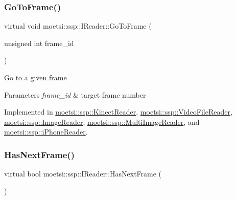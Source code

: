 \mbox{\label{classmoetsi_1_1ssp_1_1IReader_a6f1be3c06538992cca6d550bd9566681}} 
\subsubsection{\texorpdfstring{Go\+To\+Frame()}{GoToFrame()}}
{\footnotesize\ttfamily virtual void moetsi\+::ssp\+::\+I\+Reader\+::\+Go\+To\+Frame (\begin{DoxyParamCaption}\item[{unsigned int}]{frame\+\_\+id }\end{DoxyParamCaption})\hspace{0.3cm}{\ttfamily [pure virtual]}}

Go to a given frame 
\begin{DoxyParams}{Parameters}
{\em frame\+\_\+id} & target frame number \\
\hline
\end{DoxyParams}


Implemented in \hyperlink{classmoetsi_1_1ssp_1_1KinectReader_a315690c46e153a35d4ded1189e93af08}{moetsi\+::ssp\+::\+Kinect\+Reader}, \hyperlink{classmoetsi_1_1ssp_1_1VideoFileReader_ad98a532db8b1e2c3879df274b2efb082}{moetsi\+::ssp\+::\+Video\+File\+Reader}, \hyperlink{classmoetsi_1_1ssp_1_1ImageReader_a32eb88cc612e6920f4910e0803b0ce3c}{moetsi\+::ssp\+::\+Image\+Reader}, \hyperlink{classmoetsi_1_1ssp_1_1MultiImageReader_a7c552a1ad469660ea0a88b9ca85138ad}{moetsi\+::ssp\+::\+Multi\+Image\+Reader}, and \hyperlink{classmoetsi_1_1ssp_1_1iPhoneReader_a27b6dea97e4c4db8e4e749cc9e30e7ca}{moetsi\+::ssp\+::i\+Phone\+Reader}.

\mbox{\label{classmoetsi_1_1ssp_1_1IReader_af9186ba41e136dc4ec3242b5dd55fa04}} 
\subsubsection{\texorpdfstring{Has\+Next\+Frame()}{HasNextFrame()}}
{\footnotesize\ttfamily virtual bool moetsi\+::ssp\+::\+I\+Reader\+::\+Has\+Next\+Frame (\begin{DoxyParamCaption}{ }\end{DoxyParamCaption})\hspace{0.3cm}{\ttfamily [pure virtual]}}

